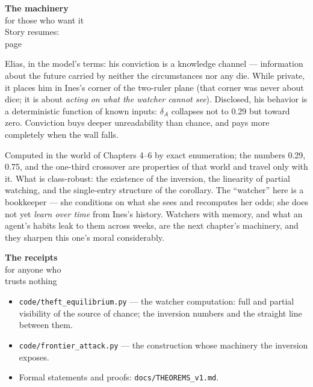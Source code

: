\begin{machinery}{\textbf{The machinery}\\for those who want it\\[3pt]{\color{muted}Story resumes:\\page~\pageref{ch9}}}

Elias, in the model's terms: his conviction is a knowledge channel ---
information about the future carried by neither the circumstances nor
any die. While private, it places him in Ines's corner of the two-ruler
plane (that corner was never about dice; it is about \emph{acting on what
the watcher cannot see}). Disclosed, his behavior is a deterministic
function of known inputs: \(\delta_A\) collapses not to 0.29 but toward zero.
Conviction buys deeper unreadability than chance, and pays more
completely when the wall falls.


Computed in the world of Chapters 4--6 by exact enumeration; the
numbers 0.29, 0.75, and the one-third crossover are properties of that
world and travel only with it. What is class-robust: the existence of
the inversion, the linearity of partial watching, and the
single-entry structure of the corollary. The
``watcher'' here is a bookkeeper --- she conditions on what she sees and
recomputes her odds; she does not yet \emph{learn over time} from Ines's
history. Watchers with memory, and what an agent's habits leak to
them across weeks, are the next chapter's machinery, and they sharpen
this one's moral considerably.

\end{machinery}

\begin{receipts}{\textbf{The receipts}\\for anyone who\\trusts nothing}


\begin{itemize}
\tightlist
\item
  \texttt{code/\allowbreak{}theft\_\allowbreak{}equilibrium.\allowbreak{}py} --- the watcher computation: full and
  partial visibility of the source of chance; the inversion numbers
  and the straight line between them.
\item
  \texttt{code/\allowbreak{}frontier\_\allowbreak{}attack.\allowbreak{}py} --- the construction whose machinery the
  inversion exposes.
\item
  Formal statements and proofs: \texttt{docs/\allowbreak{}THEOREMS\_\allowbreak{}v1.\allowbreak{}md}.
\end{itemize}

\end{receipts}

